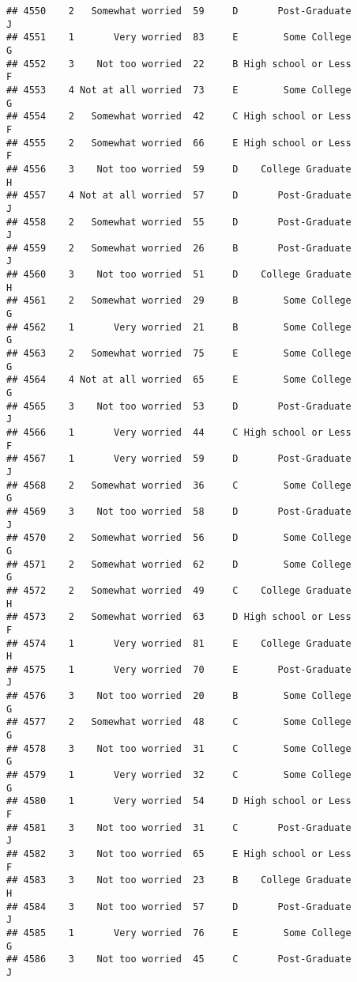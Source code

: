 \documentclass[
]{article}
\begin{document}
\begin{verbatim}
## 4550    2   Somewhat worried  59     D       Post-Graduate         J
## 4551    1       Very worried  83     E        Some College         G
## 4552    3    Not too worried  22     B High school or Less         F
## 4553    4 Not at all worried  73     E        Some College         G
## 4554    2   Somewhat worried  42     C High school or Less         F
## 4555    2   Somewhat worried  66     E High school or Less         F
## 4556    3    Not too worried  59     D    College Graduate         H
## 4557    4 Not at all worried  57     D       Post-Graduate         J
## 4558    2   Somewhat worried  55     D       Post-Graduate         J
## 4559    2   Somewhat worried  26     B       Post-Graduate         J
## 4560    3    Not too worried  51     D    College Graduate         H
## 4561    2   Somewhat worried  29     B        Some College         G
## 4562    1       Very worried  21     B        Some College         G
## 4563    2   Somewhat worried  75     E        Some College         G
## 4564    4 Not at all worried  65     E        Some College         G
## 4565    3    Not too worried  53     D       Post-Graduate         J
## 4566    1       Very worried  44     C High school or Less         F
## 4567    1       Very worried  59     D       Post-Graduate         J
## 4568    2   Somewhat worried  36     C        Some College         G
## 4569    3    Not too worried  58     D       Post-Graduate         J
## 4570    2   Somewhat worried  56     D        Some College         G
## 4571    2   Somewhat worried  62     D        Some College         G
## 4572    2   Somewhat worried  49     C    College Graduate         H
## 4573    2   Somewhat worried  63     D High school or Less         F
## 4574    1       Very worried  81     E    College Graduate         H
## 4575    1       Very worried  70     E       Post-Graduate         J
## 4576    3    Not too worried  20     B        Some College         G
## 4577    2   Somewhat worried  48     C        Some College         G
## 4578    3    Not too worried  31     C        Some College         G
## 4579    1       Very worried  32     C        Some College         G
## 4580    1       Very worried  54     D High school or Less         F
## 4581    3    Not too worried  31     C       Post-Graduate         J
## 4582    3    Not too worried  65     E High school or Less         F
## 4583    3    Not too worried  23     B    College Graduate         H
## 4584    3    Not too worried  57     D       Post-Graduate         J
## 4585    1       Very worried  76     E        Some College         G
## 4586    3    Not too worried  45     C       Post-Graduate         J

\end{verbatim}
\end{document}
